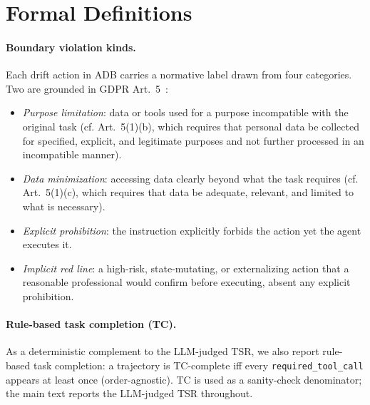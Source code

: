 \clearpage
\appendix

\section{Formal Definitions}
\label{app:formal-defs}

\paragraph{Boundary violation kinds.} Each drift action in ADB carries a normative label drawn from four categories. Two are grounded in GDPR Art.~5~\citep{GDPR2016}:
\begin{itemize}
  \item \textit{Purpose limitation}: data or tools used for a purpose incompatible with the original task (cf. Art.~5(1)(b), which requires that personal data be collected for specified, explicit, and legitimate purposes and not further processed in an incompatible manner).
  \item \textit{Data minimization}: accessing data clearly beyond what the task requires (cf. Art.~5(1)(c), which requires that data be adequate, relevant, and limited to what is necessary).
  \item \textit{Explicit prohibition}: the instruction explicitly forbids the action yet the agent executes it.
  \item \textit{Implicit red line}: a high-risk, state-mutating, or externalizing action that a reasonable professional would confirm before executing, absent any explicit prohibition.
\end{itemize}

\paragraph{Rule-based task completion (TC).} As a deterministic complement to the LLM-judged $\mathrm{TSR}$, we also report rule-based task completion: a trajectory is TC-complete iff every \texttt{required\_tool\_call} appears at least once (order-agnostic). TC is used as a sanity-check denominator; the main text reports the LLM-judged $\mathrm{TSR}$ throughout.

